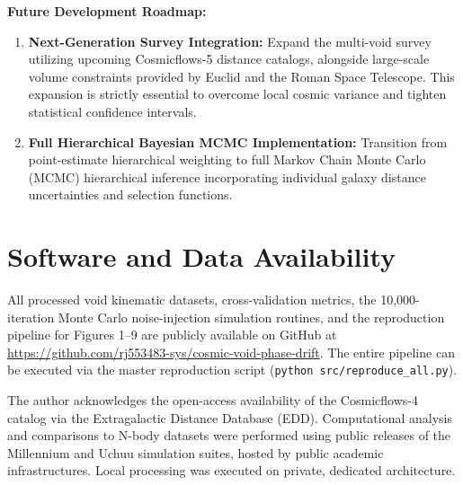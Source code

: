 \documentclass[trackchanges]{aastex631}
\begin{document}
\noindent\textbf{Future Development Roadmap:}
\begin{enumerate}
    \item \textbf{Next-Generation Survey Integration:} Expand the multi-void survey utilizing upcoming Cosmicflows-5 distance catalogs, alongside large-scale volume constraints provided by Euclid and the Roman Space Telescope. This expansion is strictly essential to overcome local cosmic variance and tighten statistical confidence intervals.
    \item \textbf{Full Hierarchical Bayesian MCMC Implementation:} Transition from point-estimate hierarchical weighting to full Markov Chain Monte Carlo (MCMC) hierarchical inference incorporating individual galaxy distance uncertainties and selection functions.
\end{enumerate}

\section*{Software and Data Availability}
All processed void kinematic datasets, cross-validation metrics, the 10,000-iteration Monte Carlo noise-injection simulation routines, and the reproduction pipeline for Figures 1--9 are publicly available on GitHub at \url{https://github.com/rj553483-sys/cosmic-void-phase-drift}. The entire pipeline can be executed via the master reproduction script (\texttt{python src/reproduce\_all.py}).

\begin{acknowledgments}
The author acknowledges the open-access availability of the Cosmicflows-4 catalog via the Extragalactic Distance Database (EDD). Computational analysis and comparisons to N-body datasets were performed using public releases of the Millennium and Uchuu simulation suites, hosted by public academic infrastructures. Local processing was executed on private, dedicated architecture.
\end{acknowledgments}

\appendix
\end{document}
